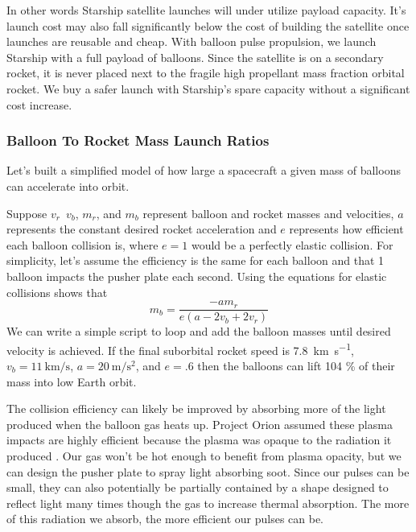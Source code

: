 \documentclass{article}
\begin{document}
In other words Starship satellite launches will under utilize payload capacity.   It's  launch cost may also fall significantly below the cost of building the satellite once launches are reusable and cheap.   With balloon pulse propulsion, we launch Starship with a full payload of balloons.   Since the satellite is on a secondary rocket, it is never placed next to the fragile high propellant mass fraction orbital rocket.   We buy a safer launch with Starship's spare capacity without a significant cost increase.

\subsubsection{Balloon To Rocket Mass Launch Ratios}\label{sec:balloon_rocket_ratio}
Let's built a simplified model of how large a spacecraft a given mass of balloons can accelerate into orbit.

Suppose \(v_r\)\,  \(v_b\),  \(m_r\), and \(m_b\) represent balloon and rocket masses and velocities,    \(a\) represents the constant desired rocket acceleration and \(e\) represents how efficient each balloon collision is, where \(e=1\) would be a perfectly elastic collision.   For simplicity, let's assume the efficiency is the same for each balloon and that 1 balloon impacts the pusher plate each second.   Using the equations for elastic collisions shows that 
\begin{equation}
m_b=\frac{-am_r}{e(a - 2v_b + 2v_r)}
\label{eq:balloon_mass}
\end{equation}
We can write a simple script \cite{balloon_mass_script} to loop and add the balloon masses until desired velocity is achieved.   If the final suborbital rocket speed is \SI{7.8}{\kilo\metre\per\second}, \(v_b=\SI{11}{\kilo\metre\per\second}\), \(a=\SI{20}{\metre\per\second\squared}\), and \(e=.6\) then the balloons can lift 104 \% of their mass into low Earth orbit.   

The collision efficiency can likely be improved by absorbing more of the light produced when the balloon gas heats up.   Project Orion assumed these plasma impacts are highly efficient because the plasma was opaque to the radiation it produced \cite{orion_reflections}.  Our gas won't be hot enough to benefit from plasma opacity, but we can design the pusher plate to spray light absorbing soot.   Since our pulses can be small, they can also potentially be partially contained by a shape designed to reflect light many times though the gas to increase thermal absorption.   The more of this radiation we absorb, the more efficient our pulses can be.  
\end{document}
